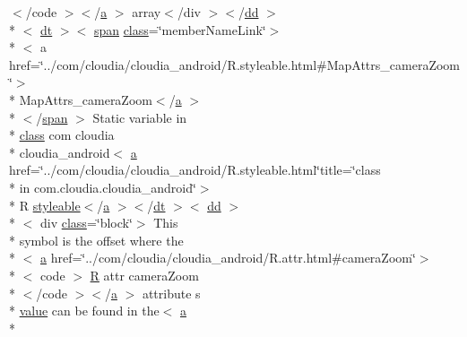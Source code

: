 \begin{DoxyCompactItemize}
$<$/code $>$$<$/\hyperlink{style_8css_a5e8981582017bb8b84c21f148345d1f7}{a} $>$ array$<$/div $>$$<$/\hyperlink{stylesheet_8css_a47f4718a86835a7771ec592ece845221}{dd} $>$\\*
$<$ \hyperlink{stylesheet_8css_a107565fb4039d33b041380d6e0ea1d80}{dt} $>$$<$ \hyperlink{stylesheet_8css_a8343996ebcf16220b04e54659aac31cc}{span} \hyperlink{_tools_8html_acf06f836132665ba8114f5a414c2403f}{class}=\char`\"{}member\-Name\-Link\char`\"{}$>$\\*
$<$ a href=\char`\"{}../com/cloudia/cloudia\-\_\-android/R.\-styleable.\-html\#Map\-Attrs\-\_\-camera\-Zoom\char`\"{}$>$\\*
 Map\-Attrs\-\_\-camera\-Zoom$<$/\hyperlink{style_8css_a5e8981582017bb8b84c21f148345d1f7}{a} $>$\\*
$<$/\hyperlink{stylesheet_8css_a8343996ebcf16220b04e54659aac31cc}{span} $>$ Static variable in \\*
\hyperlink{_tools_8html_acf06f836132665ba8114f5a414c2403f}{class} com cloudia \\*
cloudia\-\_\-android$<$ \hyperlink{style_8css_a5e8981582017bb8b84c21f148345d1f7}{a} href=\char`\"{}../com/cloudia/cloudia\-\_\-android/R.\-styleable.\-html\char`\"{}title=\char`\"{}class \\*
in com.\-cloudia.\-cloudia\-\_\-android\char`\"{}$>$\\*
 R \hyperlink{index-17_8html_ae6c9bf1e41380184b4b665ca9ab6ba0a}{styleable}$<$/\hyperlink{style_8css_a5e8981582017bb8b84c21f148345d1f7}{a} $>$$<$/\hyperlink{stylesheet_8css_a107565fb4039d33b041380d6e0ea1d80}{dt} $>$$<$ \hyperlink{stylesheet_8css_a47f4718a86835a7771ec592ece845221}{dd} $>$\\*
$<$ div \hyperlink{_tools_8html_acf06f836132665ba8114f5a414c2403f}{class}=\char`\"{}block\char`\"{}$>$ This \\*
symbol is the offset where the\\*
$<$ \hyperlink{style_8css_a5e8981582017bb8b84c21f148345d1f7}{a} href=\char`\"{}../com/cloudia/cloudia\-\_\-android/R.\-attr.\-html\#camera\-Zoom\char`\"{}$>$\\*
$<$ code $>$ \hyperlink{index-16_8html_a31e8fe59be5c20ce90a0090e28a0c1fe}{R} attr camera\-Zoom\\*
$<$/code $>$$<$/\hyperlink{style_8css_a5e8981582017bb8b84c21f148345d1f7}{a} $>$ attribute s \\*
\hyperlink{_my_s_q_l_connector_8measure_8html_afcc7a4b78ecd8fa7e713f8cfa0f51017}{value} can be found in the$<$ \hyperlink{style_8css_a5e8981582017bb8b84c21f148345d1f7}{a} \\*

\end{DoxyCompactItemize}
